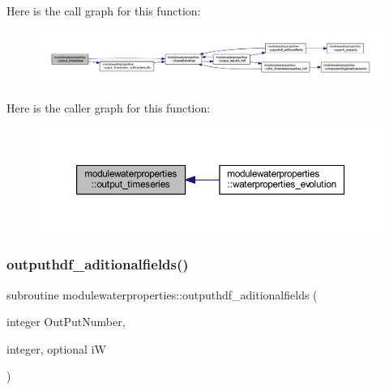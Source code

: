 Here is the call graph for this function\+:\nopagebreak
\begin{figure}[H]
\begin{center}
\leavevmode
\includegraphics[width=350pt]{namespacemodulewaterproperties_a0725e3aa303d243b60469b2ad581deaa_cgraph}
\end{center}
\end{figure}
Here is the caller graph for this function\+:\nopagebreak
\begin{figure}[H]
\begin{center}
\leavevmode
\includegraphics[width=350pt]{namespacemodulewaterproperties_a0725e3aa303d243b60469b2ad581deaa_icgraph}
\end{center}
\end{figure}
\mbox{\label{namespacemodulewaterproperties_a0e590dc368b505cd9ea918d724d3eee3}} 
\subsubsection{\texorpdfstring{outputhdf\+\_\+aditionalfields()}{outputhdf\_aditionalfields()}}
{\footnotesize\ttfamily subroutine modulewaterproperties\+::outputhdf\+\_\+aditionalfields (\begin{DoxyParamCaption}\item[{integer}]{Out\+Put\+Number,  }\item[{integer, optional}]{iW }\end{DoxyParamCaption})\hspace{0.3cm}{\ttfamily [private]}}

